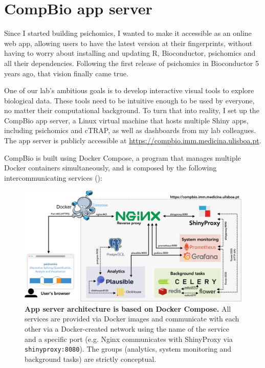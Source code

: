 \chapter{CompBio app server}
\label{chap:app-server}

Since I started building psichomics, I wanted to make it accessible as an online web app, allowing users to have the latest version at their fingerprints, without having to worry about installing and updating R, Bioconductor, psichomics and all their dependencies.
Following the first release of psichomics in Bioconductor 5 years ago, that vision finally came true.

One of our lab's ambitious goals is to develop interactive visual tools to explore biological data. These tools need to be intuitive enough to be used by everyone, no matter their computational background. To turn that into reality, I set up the CompBio app server, a Linux virtual machine that hosts multiple Shiny apps, including psichomics and cTRAP, as well as dashboards from my lab colleagues. The app server is publicly accessible at \url{https://compbio.imm.medicina.ulisboa.pt}.


CompBio is built using Docker Compose, a program that manages multiple Docker containers simultaneously, and is composed by the following intercommunicating services ():

\begin{figure}[!h]
  \includegraphics[width=1\textwidth]{images/app-server/architecture}
  \centering
  \caption[App server architecture]{\textbf{App server architecture is based on Docker Compose.} All services are provided via Docker images and communicate with each other via a Docker-created network using the name of the service and a specific port (e.g. Nginx communicates with ShinyProxy via \texttt{shinyproxy:8080}). The groups  (analytics, system monitoring and background tasks) are strictly conceptual.}
  \label{fig:architecture}
\end{figure}

